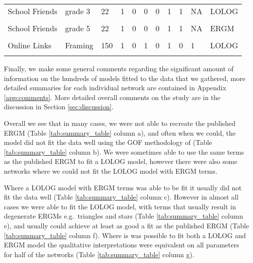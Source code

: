 \documentclass[
]{statsoc}
\begin{document}
\begin{longtable}[t]{lllllllllll}
School Friends & grade 3 & 22 & 1 & 0 & 0 & 0 & 1 & 1 & NA & LOLOG\\
\cellcolor{gray!6}{School Friends} & \cellcolor{gray!6}{grade 4} & \cellcolor{gray!6}{24} & \cellcolor{gray!6}{1} & \cellcolor{gray!6}{0} & \cellcolor{gray!6}{0} & \cellcolor{gray!6}{0} & \cellcolor{gray!6}{1} & \cellcolor{gray!6}{1} & \cellcolor{gray!6}{NA} & \cellcolor{gray!6}{ERGM}\\
School Friends & grade 5 & 22 & 1 & 0 & 0 & 0 & 1 & 1 & NA & ERGM\\
\cellcolor{gray!6}{Online Links} & \cellcolor{gray!6}{Hyperlinks} & \cellcolor{gray!6}{158} & \cellcolor{gray!6}{1} & \cellcolor{gray!6}{0} & \cellcolor{gray!6}{1} & \cellcolor{gray!6}{0} & \cellcolor{gray!6}{1} & \cellcolor{gray!6}{1} & \cellcolor{gray!6}{1} & \cellcolor{gray!6}{LOLOG}\\
\addlinespace
Online Links & Framing & 150 & 1 & 0 & 1 & 0 & 1 & 0 & 1 & LOLOG\\
\midrule
\midrule
\cellcolor{gray!6}{Column Proportion} & \cellcolor{gray!6}{NA} & \cellcolor{gray!6}{NA} & \cellcolor{gray!6}{0.43} & \cellcolor{gray!6}{0.37} & \cellcolor{gray!6}{0.46} & \cellcolor{gray!6}{0.23} & \cellcolor{gray!6}{0.94} & \cellcolor{gray!6}{0.86} & \cellcolor{gray!6}{0.5} & \cellcolor{gray!6}{NA}\\
\bottomrule
\end{longtable}

Finally, we make some general comments regarding the significant amount
of information on the hundreds of models fitted to the data that we
gathered, more detailed summaries for each individual network are
contained in Appendix \ref{app:comments}. More detailed overall comments
on the study are in the discussion in Section \ref{sec:discussion}.

Overall we see that in many cases, we were not able to recreate the
published ERGM (Table \ref{tab:summary_table} column a), and often when
we could, the model did not fit the data well using the GOF methodology
of \cite{Hunter_Goodreau_2008} (Table \ref{tab:summary_table} column b).
We were sometimes able to use the same terms as the published ERGM to
fit a LOLOG model, however there were also some networks where we could
not fit the LOLOG model with ERGM terms.

Where a LOLOG model with ERGM terms was able to be fit it usually did
not fit the data well (Table \ref{tab:summary_table} column c). However
in almost all cases we were able to fit the LOLOG model, with terms that
usually result in degenerate ERGMs e.g.~triangles and stars (Table
\ref{tab:summary_table} column e), and usually could achieve at least as
good a fit as the published ERGM (Table \ref{tab:summary_table} column
f). Where is was possible to fit both a LOLOG and ERGM model the
qualitative interpretations were equivalent on all parameters for half
of the networks (Table \ref{tab:summary_table} column g).
\end{document}
